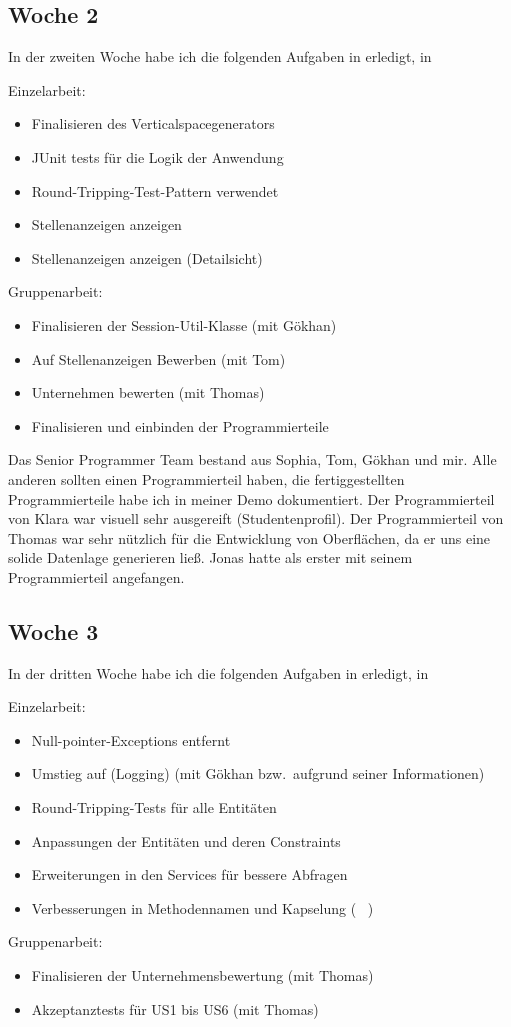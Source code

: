 \subsection{Woche 2}\label{subsec:s2w2}
In der zweiten Woche habe ich die folgenden Aufgaben in erledigt, in

Einzelarbeit:
\begin{itemize}
    \item Finalisieren des Verticalspacegenerators
    \item JUnit tests für die Logik der Anwendung
    \item Round-Tripping-Test-Pattern verwendet
    \item Stellenanzeigen anzeigen
    \item Stellenanzeigen anzeigen (Detailsicht)

\end{itemize}

Gruppenarbeit:

\begin{itemize}
    \item Finalisieren der Session-Util-Klasse (mit Gökhan)
    \item Auf Stellenanzeigen Bewerben (mit Tom)
    \item Unternehmen bewerten (mit Thomas)
    \item Finalisieren und einbinden der Programmierteile
\end{itemize}
Das Senior Programmer Team bestand aus Sophia, Tom, Gökhan und mir.
Alle anderen sollten einen Programmierteil haben, die fertiggestellten Programmierteile habe ich
in meiner Demo\cite*[]{demo1} dokumentiert.
Der Programmierteil von Klara war visuell sehr ausgereift (Studentenprofil).
Der Programmierteil von Thomas war sehr nützlich für die Entwicklung von Oberflächen, da er uns
eine solide Datenlage generieren ließ.
Jonas hatte als erster mit seinem Programmierteil angefangen.

\subsection{Woche 3}\label{subsec:s2w3}
In der dritten Woche habe ich die folgenden Aufgaben in erledigt, in

Einzelarbeit:
\begin{itemize}
    \item Null-pointer-Exceptions entfernt
    \item Umstieg auf  (Logging) (mit Gökhan bzw.\ aufgrund seiner Informationen)
    \item Round-Tripping-Tests für alle Entitäten
    \item Anpassungen der Entitäten und deren Constraints
    \item Erweiterungen in den Services für bessere Abfragen
    \item Verbesserungen in Methodennamen und Kapselung ( \textrightarrow \ )

\end{itemize}

Gruppenarbeit:

\begin{itemize}
    \item Finalisieren der Unternehmensbewertung (mit Thomas)
    \item Akzeptanztests für US1 bis US6 (mit Thomas)
\end{itemize}